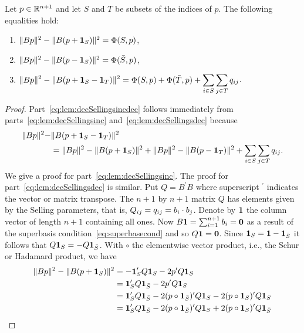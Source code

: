 \documentclass[final,leqno]{siamltex}
\begin{document}
\begin{lemma}\label{lem:decSellings}
Let $p \in {\mathbb R}^{n+1}$ and let $S$ and $T$ be subsets of the indices of $p$.  The following equalities hold:
\begin{enumerate}
\item  $\|Bp\|^2 - \|B(p + \boldsymbol{1}_S)\|^2 = \Phi(S, p)$, \label{eq:lem:decSellingsinc}
\item  $\|Bp\|^2 - \|B(p - \boldsymbol{1}_S)\|^2 = \Phi(\bar{S}, p)$, \label{eq:lem:decSellingsdec}
\item  ${\displaystyle \|Bp\|^2 - \|B(p + \boldsymbol{1}_S - \boldsymbol{1}_T)\|^2 = \Phi(S, p) + \Phi(\bar{T},p) + \sum_{i\in S}\sum_{j\in T} q_{ij} }$.  \label{eq:lem:decSellingsincdec}
\end{enumerate}
\end{lemma}
\begin{proof}
Part~\ref{eq:lem:decSellingsincdec} follows immediately from parts~\ref{eq:lem:decSellingsinc} and~\ref{eq:lem:decSellingsdec} because
\begin{align*}
\|Bp\|^2 - &\|B(p + \boldsymbol{1}_S - \boldsymbol{1}_T)\|^2 \\
&= \|Bp\|^2-\|B(p + \boldsymbol{1}_S)\|^2 +  \|Bp\|^2-\|B(p - \boldsymbol{1}_T)\|^2 + \sum_{i\in S}\sum_{j\in T} q_{ij}.
\end{align*}
We give a proof for part~\ref{eq:lem:decSellingsinc}.  The proof for part~\ref{eq:lem:decSellingsdec} is similar.  
Put $Q = B^\prime B$ where superscript $^\prime$ indicates the vector or matrix transpose.  The $n+1$ by $n+1$ matrix $Q$ has elements given by the Selling parameters, that is, $Q_{ij} = q_{ij}=b_i \cdot b_j$.  Denote by $\boldsymbol{1}$ the column vector of length $n+1$ containing all ones.  Now $B\boldsymbol{1} = \sum_{i=1}^{n+1}b_i = \boldsymbol{0}$ as a result of the superbasis condition~\eqref{eq:superbasecond} and so $Q\boldsymbol{1} = \boldsymbol{0}$.  Since $\boldsymbol{1}_S = \boldsymbol{1} - \boldsymbol{1}_{\bar{S}}$ it follows that $Q\boldsymbol{1}_S = -Q\boldsymbol{1}_{\bar{S}}$.  With $\circ$ the elementwise vector product, i.e., the Schur or Hadamard product, we have
 \begin{align*}
 \|Bp\|^2 - \|B(p + \onebf_S)\|^2 &= -\onebf^\prime_S Q \onebf_S - 2 p^\prime Q \onebf_S \\
 &= \onebf^\prime_S Q \onebf_{\bar{S}} - 2 p^\prime Q \onebf_S \\
&= \onebf^\prime_S Q \onebf_{\bar{S}} - 2 (p\circ\onebf_{\bar{S}})^\prime Q \onebf_S - 2 (p\circ\onebf_S)^\prime Q \onebf_S \\
&= \onebf^\prime_S Q \onebf_{\bar{S}} - 2 (p\circ\onebf_{\bar{S}})^\prime Q \onebf_{S} + 2 (p\circ\onebf_S)^\prime Q \onebf_{\bar{S}}

\end{align*}
\end{proof}
\end{document}
